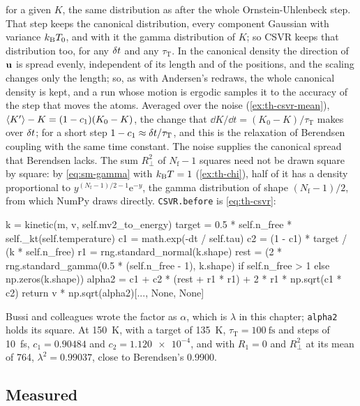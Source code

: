 for a given $K$, the same distribution as after the whole
Ornstein-Uhlenbeck step. That step keeps the canonical distribution, every
component Gaussian with variance $k_{\mathrm{B}} T_0$, and with it the gamma
distribution of $K$; so CSVR keeps that distribution too, for any $\delta t$
and any $\tau_{\mathrm T}$. In the canonical density the direction of
$\bm{\mathrm{u}}$ is spread evenly, independent of its length and of the
positions, and the scaling changes only the length; so, as with
Andersen's redraws, the whole canonical density is kept, and a run whose
motion is ergodic samples it to the accuracy of the step that moves the
atoms. Averaged over the noise
(\cref{ex:th-csvr-mean}), $\langle K' \rangle - K = (1 - c_1)(K_0 - K)$, the change
that $\dd K/\dd t = (K_0 - K)/\tau_{\mathrm T}$ makes over $\delta t$; for a
short step $1 - c_1 \approx \delta t/\tau_{\mathrm T}$, and this is the
relaxation of Berendsen coupling with the same time constant. The noise
supplies the canonical spread that Berendsen lacks. The sum $R_\perp^2$ of
$N_{\mathrm f} - 1$ squares need not be drawn square by square: by
\cref{eq:sm-gamma} with $k_{\mathrm{B}} T = 1$ (\cref{ex:th-chi}), half of it has a
density proportional to $y^{(N_{\mathrm f} - 1)/2 - 1}\mathrm{e}^{-y}$,
the gamma distribution of shape $(N_{\mathrm f} - 1)/2$, from which NumPy
draws directly. \texttt{CSVR.before} is \cref{eq:th-csvr}:

\begin{code}
        k = kinetic(m, v, self.mv2_to_energy)
        target = 0.5 * self.n_free * self._kt(self.temperature)
        c1 = math.exp(-dt / self.tau)
        c2 = (1 - c1) * target / (k * self.n_free)
        r1 = rng.standard_normal(k.shape)
        rest = (2 * rng.standard_gamma(0.5 * (self.n_free - 1), k.shape)
                if self.n_free > 1 else np.zeros(k.shape))
        alpha2 = c1 + c2 * (rest + r1 * r1) + 2 * r1 * np.sqrt(c1 * c2)
        return v * np.sqrt(alpha2)[..., None, None]
\end{code}

\noindent Bussi and colleagues wrote the factor as $\alpha$, which is
$\lambda$ in this chapter; \texttt{alpha2} holds its square. At \SI{150}{\kelvin},
with a target of \SI{135}{\kelvin}, $\tau_{\mathrm T} =
\SI{100}{\femto\second}$ and steps of \SI{10}{\femto\second}, $c_1 =
0.90484$ and $c_2 = \num{1.120e-4}$, and with $R_1 = 0$ and $R_\perp^2$ at its
mean of 764, $\lambda^2 = 0.99037$, close to Berendsen's 0.9900.

\subsection*{Measured}

